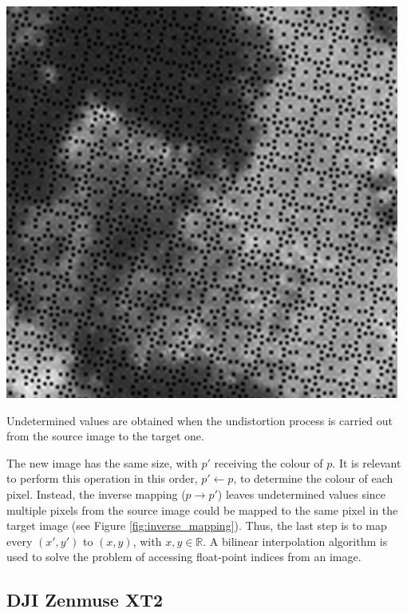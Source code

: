 \begin{marginfigure}[-1.5cm]
	\includegraphics{figs/materials/inverse_mapping.png}
	\caption{Undetermined values are obtained when the undistortion process is carried out from the source image to the target one.}
	\label{fig:inverse_mapping}
\end{marginfigure}
The new image has the same size, with $p'$ receiving the colour of $p$. It is relevant to perform this operation in this order, $p' \gets p$, to determine the colour of each pixel. Instead, the inverse mapping ($p \rightarrow p'$) leaves undetermined values since multiple pixels from the source image could be mapped to the same pixel in the target image (see Figure \ref{fig:inverse_mapping}). Thus, the last step is to map every $(x', y')$ to $(x, y)$, with $x, y \in \mathbb{R}$. A bilinear interpolation algorithm is used to solve the problem of accessing float-point indices from an image.

\subsection{DJI Zenmuse XT2}

